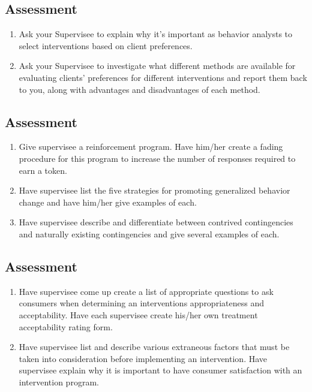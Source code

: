 \subsection{Assessment}
\begin{enumerate}
\item Ask your Supervisee to explain why it's important as behavior analysts to select interventions based on client preferences. 
\item Ask your Supervisee to investigate what different methods are available for evaluating clients' preferences for different interventions and report them back to you, along with advantages and disadvantages of each method.
\end{enumerate}
%
\subsection{Assessment}
\begin{enumerate}
\item Give supervisee a reinforcement program. Have him/her create a fading procedure for this program to increase the number of responses required to earn a token. 
\item Have supervisee list the five strategies for promoting generalized behavior change and have him/her give examples of each.
\item Have supervisee describe and differentiate between contrived contingencies and naturally existing contingencies and give several examples of each.
%
\end{enumerate}
%
\subsection{Assessment}
\begin{enumerate}
\item Have supervisee come up create a list of appropriate questions to ask consumers when determining an interventions appropriateness and acceptability. Have each supervisee create his/her own treatment acceptability rating form.
\item Have supervisee list and describe various extraneous factors that must be taken into consideration before implementing an intervention. Have supervisee explain why it is important to have consumer satisfaction with an intervention program.
\end{enumerate}
%

